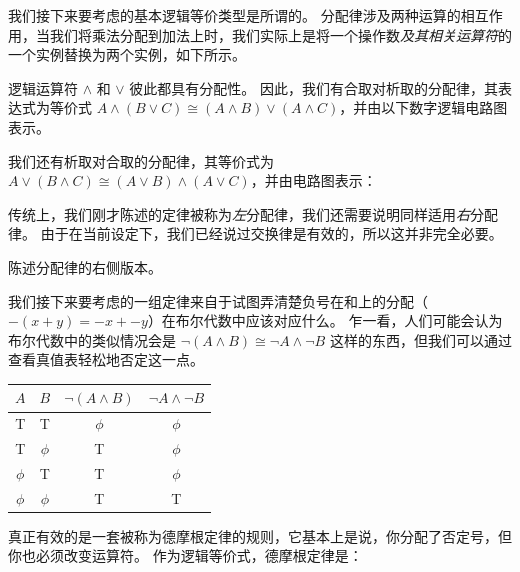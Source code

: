 我们接下来要考虑的基本逻辑等价类型是所谓的。
分配律涉及两种运算的相互作用，当我们将乘法分配到加法上时，我们实际上是将一个操作数{\em 及其相关运算符}的一个实例替换为两个实例，如下所示。

\begin{center}

\end{center}   
  
逻辑运算符 $\land$ 和 $\lor$ 彼此都具有分配性。
因此，我们有合取对析取的分配律，其表达式为等价式 $A \land (B \lor C) \cong (A \land B) \lor (A \land C)$，并由以下数字逻辑电路图表示。

\begin{center}

\end{center}   

我们还有析取对合取的分配律，其等价式为 $A \lor (B \land C) \cong (A \lor B) \land (A \lor C)$，并由电路图表示：

\begin{center}

\end{center}   

传统上，我们刚才陈述的定律被称为{\em 左}分配律，我们还需要说明同样适用{\em 右}分配律。
由于在当前设定下，我们已经说过交换律是有效的，所以这并非完全必要。

\begin{exer}
陈述分配律的右侧版本。
\end{exer}

我们接下来要考虑的一组定律来自于试图弄清楚负号在和上的分配（$-(x+y) = -x + -y$）在布尔代数中应该对应什么。
乍一看，人们可能会认为布尔代数中的类似情况会是 ${\lnot}(A \land B) \cong {\lnot}A \land {\lnot}B$ 这样的东西，但我们可以通过查看真值表轻松地否定这一点。

\begin{center}
\begin{tabular}{c|c||c|c}
\; $A$ \; & \; $B$ \; & \; ${\lnot}(A \land B)$ \; & \; ${\lnot}A \land {\lnot}B$\; \\ \hline
T & T &  $\phi$ & $\phi$ \\
T & $\phi$ & T & $\phi$ \\
 $\phi$ & T & T & $\phi$ \\
 $\phi$ &  $\phi$  & T & T\\
\end{tabular}
\end{center}

真正有效的是一套被称为德摩根定律的规则，它基本上是说，你分配了否定号，但你也必须改变运算符。
作为逻辑等价式，德摩根定律是：

